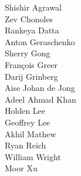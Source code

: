Shishir Agrawal\\
Zev Chonoles\\
Rankeya Datta\\
Anton Geraschenko\\
Sherry Gong\\
Fran\c{c}ois Greer\\
Darij Grinberg\\
Aise Johan de Jong\\
Adeel Ahmad Khan\\
Holden Lee\\
Geoffrey Lee\\
Akhil Mathew\\
Ryan Reich\\
William Wright\\
Moor Xu\\
